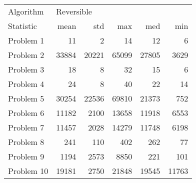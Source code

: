 \begin{tabular}{lrrrrr}
\toprule
Algorithm & \multicolumn{5}{l}{Reversible} \\
Statistic &       mean &    std &    max &    med &    min \\
\midrule
Problem 1  &         11 &      2 &     14 &     12 &      6 \\
Problem 2  &      33884 &  20221 &  65099 &  27805 &   3629 \\
Problem 3  &         18 &      8 &     32 &     15 &      6 \\
Problem 4  &         24 &      8 &     40 &     22 &     14 \\
Problem 5  &      30254 &  22536 &  69810 &  21373 &    752 \\
Problem 6  &      11182 &   2100 &  13658 &  11918 &   6553 \\
Problem 7  &      11457 &   2028 &  14279 &  11748 &   6198 \\
Problem 8  &        241 &    110 &    402 &    262 &     77 \\
Problem 9  &       1194 &   2573 &   8850 &    221 &    101 \\
Problem 10 &      19181 &   2750 &  21848 &  19545 &  11763 \\
\bottomrule
\end{tabular}
